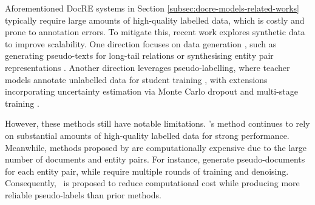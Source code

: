 Aforementioned DocRE systems in Section \ref{subsec:docre-models-related-works} typically require large amounts of high-quality labelled data, which is costly and prone to annotation errors. To mitigate this, recent work explores synthetic data to improve scalability. One direction focuses on data generation \citep{tan2022document, sun2023uncertainty, feng2024dure, tran2025vaediff}, such as generating pseudo-texts for long-tail relations \citep{feng2024dure} or synthesising entity pair representations \citep{tran2025vaediff}. Another direction leverages pseudo-labelling, where teacher models annotate unlabelled data for student training \citep{tan2022document}, with extensions incorporating uncertainty estimation via Monte Carlo dropout and multi-stage training \citep{sun2023uncertainty}.

However, these methods still have notable limitations. \citet{tran2025vaediff}'s method continues to rely on substantial amounts of high-quality labelled data for strong performance. Meanwhile, methods proposed by \citet{sun2023uncertainty, feng2024dure} are computationally expensive due to the large number of documents and entity pairs. For instance, \citet{feng2024dure} generate pseudo-documents for each entity pair, while \citet{sun2023uncertainty} require multiple rounds of training and denoising. Consequently, \model\ is proposed to reduce computational cost while producing more reliable pseudo-labels than prior methods.